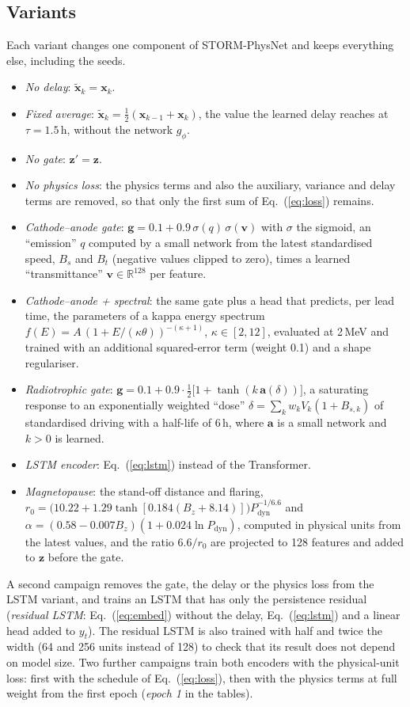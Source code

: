 \documentclass[a4paper,fleqn]{cas-dc}
\begin{document}
\subsection{Variants}
\label{sec:variants}
Each variant changes one component of STORM-PhysNet and keeps everything else, including the seeds.
\begin{itemize}
\item \emph{No delay}: \(\tilde{\mathbf x}_k=\mathbf x_k\).
\item \emph{Fixed average}: \(\tilde{\mathbf x}_k=\frac12(\mathbf x_{k-1}+\mathbf x_k)\), the value the learned delay
reaches at \(\tau=1.5\)\,h, without the network \(g_\phi\).
\item \emph{No gate}: \(\mathbf z'=\mathbf z\).
\item \emph{No physics loss}: the physics terms and also the auxiliary, variance and delay terms are removed, so
that only the first sum of Eq.~(\ref{eq:loss}) remains.
\item \emph{Cathode--anode gate}: \(\mathbf g=0.1+0.9\,\sigma(q)\,\sigma(\mathbf v)\) with \(\sigma\) the sigmoid, an
``emission'' \(q\) computed by a small network from the latest standardised speed, \(B_s\) and \(B_t\) (negative
values clipped to zero), times a learned ``transmittance'' \(\mathbf v\in\mathbb R^{128}\) per feature.
\item \emph{Cathode--anode + spectral}: the same gate plus a head that predicts, per lead time, the parameters of a
kappa energy spectrum \(f(E)=A\,(1+E/(\kappa\theta))^{-(\kappa+1)}\), \(\kappa\in[2,12]\), evaluated at 2\,MeV and
trained with an additional squared-error term (weight 0.1) and a shape regulariser.
\item \emph{Radiotrophic gate}: \(\mathbf g=0.1+0.9\cdot\tfrac12\big[1+\tanh(k\,\mathbf a(\delta))\big]\), a saturating
response to an exponentially weighted ``dose'' \(\delta=\sum_k w_k V_k(1+B_{s,k})\) of standardised driving with a
half-life of 6\,h, where \(\mathbf a\) is a small network and \(k>0\) is learned.
\item \emph{LSTM encoder}: Eq.~(\ref{eq:lstm}) instead of the Transformer.
\item \emph{Magnetopause}: the \citet{shue1998} stand-off distance and flaring,
\(r_0=\big(10.22+1.29\tanh[0.184(B_z+8.14)]\big)P_{\mathrm{dyn}}^{-1/6.6}\) and
\(\alpha=(0.58-0.007B_z)(1+0.024\ln P_{\mathrm{dyn}})\), computed in physical units from the latest values, and the
ratio \(6.6/r_0\) are projected to 128 features and added to \(\mathbf z\) before the gate.
\end{itemize}
A second campaign removes the gate, the delay or the physics loss from the LSTM variant, and trains an LSTM that has
only the persistence residual (\emph{residual LSTM}: Eq.~(\ref{eq:embed}) without the delay, Eq.~(\ref{eq:lstm}) and a
linear head added to \(y_t\)). The residual LSTM is also trained with half and twice the width (64 and 256 units
instead of 128) to check that its result does not depend on model size. Two further campaigns train both
encoders with the physical-unit loss: first with the schedule of Eq.~(\ref{eq:loss}), then with the physics terms
at full weight from the first epoch (\emph{epoch 1} in the tables).
\end{document}
